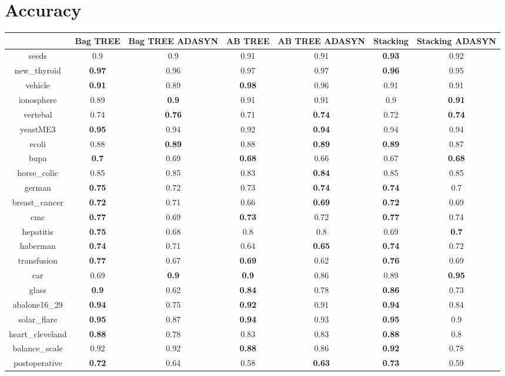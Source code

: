 \documentclass{article}%
\begin{document}
%
\normalsize%
\section*{Accuracy}%
\begin{tabular}{c|cccccc}%
&Bag TREE&Bag TREE ADASYN&AB TREE&AB TREE ADASYN&Stacking&Stacking ADASYN\\%
\hline%
seeds&0.9&0.9&0.91&0.91&\textbf{0.93}&0.92\\%
new\_thyroid&\textbf{0.97}&0.96&0.97&0.97&\textbf{0.96}&0.95\\%
vehicle&\textbf{0.91}&0.89&\textbf{0.98}&0.96&0.91&0.91\\%
ionosphere&0.89&\textbf{0.9}&0.91&0.91&0.9&\textbf{0.91}\\%
vertebal&0.74&\textbf{0.76}&0.71&\textbf{0.74}&0.72&\textbf{0.74}\\%
yeastME3&\textbf{0.95}&0.94&0.92&\textbf{0.94}&0.94&0.94\\%
ecoli&0.88&\textbf{0.89}&0.88&\textbf{0.89}&\textbf{0.89}&0.87\\%
bupa&\textbf{0.7}&0.69&\textbf{0.68}&0.66&0.67&\textbf{0.68}\\%
horse\_colic&0.85&0.85&0.83&\textbf{0.84}&0.85&0.85\\%
german&\textbf{0.75}&0.72&0.73&\textbf{0.74}&\textbf{0.74}&0.7\\%
breast\_cancer&\textbf{0.72}&0.71&0.66&\textbf{0.69}&\textbf{0.72}&0.69\\%
cmc&\textbf{0.77}&0.69&\textbf{0.73}&0.72&\textbf{0.77}&0.74\\%
hepatitis&\textbf{0.75}&0.68&0.8&0.8&0.69&\textbf{0.7}\\%
haberman&\textbf{0.74}&0.71&0.64&\textbf{0.65}&\textbf{0.74}&0.72\\%
transfusion&\textbf{0.77}&0.67&\textbf{0.69}&0.62&\textbf{0.76}&0.69\\%
car&0.69&\textbf{0.9}&\textbf{0.9}&0.86&0.89&\textbf{0.95}\\%
glass&\textbf{0.9}&0.62&\textbf{0.84}&0.78&\textbf{0.86}&0.73\\%
abalone16\_29&\textbf{0.94}&0.75&\textbf{0.92}&0.91&\textbf{0.94}&0.84\\%
solar\_flare&\textbf{0.95}&0.87&\textbf{0.94}&0.93&\textbf{0.95}&0.9\\%
heart\_cleveland&\textbf{0.88}&0.78&0.83&0.83&\textbf{0.88}&0.8\\%
balance\_scale&0.92&0.92&\textbf{0.88}&0.86&\textbf{0.92}&0.78\\%
postoperative&\textbf{0.72}&0.64&0.58&\textbf{0.63}&\textbf{0.73}&0.59\\%
\end{tabular}
\end{document}
